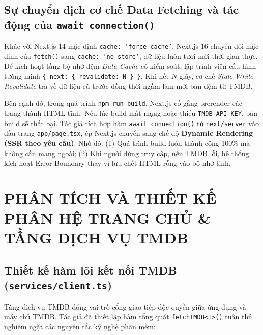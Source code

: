 \documentclass[12pt,a4paper]{extarticle}
\begin{document}
\subsection{Sự chuyển dịch cơ chế Data Fetching và tác động của \texttt{await connection()}}
Khác với Next.js 14 mặc định \texttt{cache: 'force-cache'}, Next.js 16 chuyển đổi mặc định của \texttt{fetch()} sang \texttt{cache: 'no-store'}, dữ liệu luôn tươi mới thời gian thực. Để kích hoạt tầng bộ nhớ đệm \textit{Data Cache} có kiểm soát, lập trình viên cấu hình tường minh \texttt{\{ next: \{ revalidate: N \} \}}. Khi hết $N$ giây, cơ chế \textit{Stale-While-Revalidate} trả về dữ liệu cũ trước đồng thời ngầm làm mới bản đệm từ TMDB.

Bên cạnh đó, trong quá trình \texttt{npm run build}, Next.js cố gắng prerender các trang thành HTML tĩnh. Nếu lúc build mất mạng hoặc thiếu \texttt{TMDB\_API\_KEY}, bản build sẽ thất bại. Tác giả tích hợp hàm \texttt{await connection()} từ \texttt{next/server} vào đầu trang \texttt{app/page.tsx}, ép Next.js chuyển sang chế độ \textbf{Dynamic Rendering (SSR theo yêu cầu)}. Nhờ đó: (1) Quá trình build luôn thành công 100\% mà không cần mạng ngoài; (2) Khi người dùng truy cập, nếu TMDB lỗi, hệ thống kích hoạt Error Boundary thay vì lưu chết HTML rỗng vào bộ nhớ tĩnh.

\section{PHÂN TÍCH VÀ THIẾT KẾ PHÂN HỆ TRANG CHỦ \& TẦNG DỊCH VỤ TMDB}

\subsection{Thiết kế hàm lõi kết nối TMDB (\texttt{services/client.ts})}
Tầng dịch vụ TMDB đóng vai trò cổng giao tiếp độc quyền giữa ứng dụng và máy chủ TMDB. Tác giả đã thiết lập hàm tổng quát \texttt{fetchTMDB<T>()} tuân thủ nghiêm ngặt các nguyên tắc kỹ nghệ phần mềm:
\end{document}
